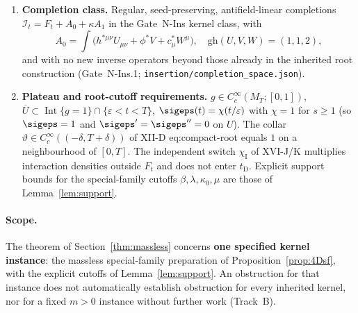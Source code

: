 \begin{enumerate}
  \textbf{not} claimed discharged in this revision (support defect recorded there).
\item[\textbf{(H4)}]\label{H:class}\textbf{Completion class.}
  Regular, seed-preserving, antifield-linear completions
  $\mathcal I_t=F_t+A_0+\kappa A_1$ in the Gate~N-Ins kernel class, with
  \[
  A_0=\int\bigl(h^{*\mu\nu}U_{\mu\nu}+\phi^*V+c^*_\mu W^\mu\bigr),
  \quad\mathrm{gh}(U,V,W)=(1,1,2),
  \]
  and with no new inverse operators beyond those already in the inherited root
  construction (Gate~N-Ins.1; \texttt{insertion/completion\_space.json}).
\item[\textbf{(H5)}]\label{H:plateau}\textbf{Plateau and root-cutoff requirements.}
  $g\in C_c^\infty(M_T;[0,1])$,
  $\overline U\subset\operatorname{Int}\{g=1\}\cap\{\varepsilon<t<T\}$,
  $\sigeps(t)=\chi(t/\varepsilon)$ with $\chi=1$ for $s\ge1$ (so $\sigeps=1$ and
  $\sigeps'=\sigeps''=0$ on $U$). The collar $\vartheta\in C_c^\infty((-\delta,T+\delta))$
  of XII-D eq:compact-root equals $1$ on a neighbourhood of $[0,T]$.
  The independent switch $\chi_{\mathrm I}$ of XVI-J/K multiplies interaction densities
  outside $F_t$ and does not enter $t_{\mathrm D}$. Explicit support bounds for the
  special-family cutoffs $\beta,\lambda,\kappa_0,\mu$ are those of Lemma~\ref{lem:support}.
\end{enumerate}

\paragraph{Scope.}
The theorem of Section~\ref{thm:massless} concerns \textbf{one specified kernel instance}:
the massless special-family preparation of Proposition~\ref{prop:4Dsf}, with the explicit
cutoffs of Lemma~\ref{lem:support}. An obstruction for that instance does not automatically
establish obstruction for every inherited kernel, nor for a fixed $m>0$ instance without
further work (Track~B).
